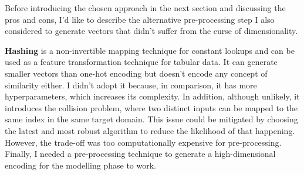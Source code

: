 Before introducing the chosen approach in the next section and discussing the pros and cons,
I'd like to describe the alternative pre-processing step I also considered to generate vectors
that didn't suffer from the curse of dimensionality.

\textbf{Hashing} is a non-invertible mapping technique for constant lookups
and can be used as a feature transformation technique for tabular data.
It can generate smaller vectors than one-hot encoding but doesn't encode any concept of similarity either.
I didn't adopt it because, in comparison, it has more hyperparameters, which increases its complexity.
In addition, although unlikely, it introduces the collision problem,
where two distinct inputs can be mapped to the same index in the same target domain.
This issue could be mitigated by choosing the latest and most robust algorithm to reduce the likelihood of that happening.
However, the trade-off was too computationally expensive for pre-processing.
Finally, I needed a pre-processing technique to generate a high-dimensional encoding for the modelling phase to work.

